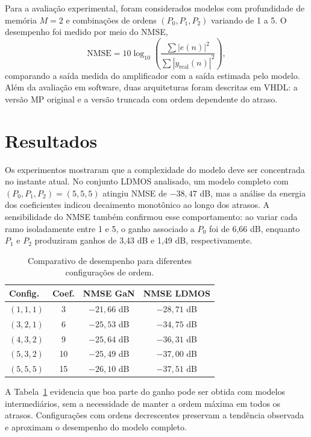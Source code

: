 \documentclass[sigconf]{acmart}
\begin{document}
Para a avalia\c{c}\~ao experimental, foram considerados modelos com profundidade de mem\'oria $M=2$ e combina\c{c}\~oes de ordens $(P_0, P_1, P_2)$ variando de 1 a 5. O desempenho foi medido por meio do NMSE,
\begin{equation}
  \mathrm{NMSE} = 10\log_{10}\left(\frac{\sum |e(n)|^2}{\sum |y_{\mathrm{real}}(n)|^2}\right),
\end{equation}
comparando a sa\'ida medida do amplificador com a sa\'ida estimada pelo modelo. Al\'em da avalia\c{c}\~ao em software, duas arquiteturas foram descritas em VHDL: a vers\~ao MP original e a vers\~ao truncada com ordem dependente do atraso.

\section{Resultados}
Os experimentos mostraram que a complexidade do modelo deve ser concentrada no instante atual. No conjunto LDMOS analisado, um modelo completo com $(P_0,P_1,P_2)=(5,5,5)$ atingiu NMSE de $-38{,}47$ dB, mas a an\'alise da energia dos coeficientes indicou decaimento monot\^onico ao longo dos atrasos. A sensibilidade do NMSE tamb\'em confirmou esse comportamento: ao variar cada ramo isoladamente entre 1 e 5, o ganho associado a $P_0$ foi de 6,66 dB, enquanto $P_1$ e $P_2$ produziram ganhos de 3,43 dB e 1,49 dB, respectivamente.

\begin{table}[t]
  \caption{Comparativo de desempenho para diferentes configura\c{c}\~oes de ordem.}
  \label{tab:nmse}
  \centering
  \begin{tabular}{>{\centering\arraybackslash}p{1.6cm} c c c}
    \toprule
    \textbf{Config.} & \textbf{Coef.} & \textbf{NMSE GaN} & \textbf{NMSE LDMOS} \\
    \midrule
    $(1,1,1)$ & 3  & $-21{,}66$ dB & $-28{,}71$ dB \\
    $(3,2,1)$ & 6  & $-25{,}53$ dB & $-34{,}75$ dB \\
    $(4,3,2)$ & 9  & $-25{,}64$ dB & $-36{,}31$ dB \\
    $(5,3,2)$ & 10 & $-25{,}49$ dB & $-37{,}00$ dB \\
    $(5,5,5)$ & 15 & $-26{,}10$ dB & $-37{,}51$ dB \\
    \bottomrule
  \end{tabular}
\end{table}

A Tabela~\ref{tab:nmse} evidencia que boa parte do ganho pode ser obtida com modelos intermedi\'arios, sem a necessidade de manter a ordem m\'axima em todos os atrasos. Configura\c{c}\~oes com ordens decrescentes preservam a tend\^encia observada e aproximam o desempenho do modelo completo.
\end{document}
